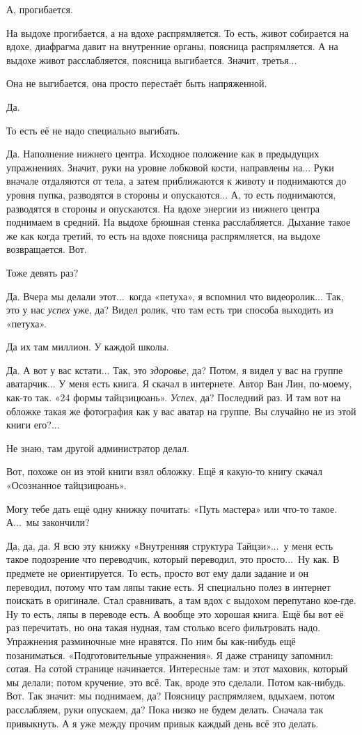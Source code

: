 \M
А, прогибается.

\I
На выдохе прогибается, а на вдохе распрямляется. То есть, живот собирается на вдохе,
диафрагма давит на внутренние органы, поясница распрямляется.
А на выдохе живот расслабляется, поясница выгибается. Значит, третья...

\M
Она не выгибается, она просто перестаёт быть напряженной.

\I
Да. 

\M
То есть её не надо
специально выгибать.

\I
Да. Наполнение нижнего центра. Исходное положение как в предыдущих упражнениях.
Значит, руки на уровне лобковой кости, направлены на... Руки вначале отдаляются от тела,
а затем приближаются к животу и поднимаются до уровня пупка, разводятся
в стороны и опускаются... А, то есть поднимаются, разводятся в стороны и опускаются.
На вдохе энергии из нижнего центра поднимаем в средний.
На выдохе брюшная стенка расслабляется. Дыхание такое
же как когда третий, то есть на вдохе поясница
распрямляется, на выдохе возвращается. Вот.

\M
Тоже девять раз?

\I
Да. Вчера мы делали этот...\ когда «петуха», я вспомнил что видеоролик...
Так, это у нас {\it успех\/} уже, да? Видел ролик, что там
есть три способа выходить из «петуха».

\M
Да их там миллион. У каждой школы.

\I
Да. А вот у вас кстати... Так, это {\it здоровье}, да?
Потом, я видел у
вас на группе аватарчик...
У меня есть книга. Я скачал в интернете. Автор Ван Лин, по-моему, как-то так.
«24 формы тайцзицюань». {\it Успех}, да? Последний раз. И там вот на обложке такая же фотография
как у вас аватар на группе. Вы случайно не из этой книги его?...

\M
Не знаю, там другой администратор делал.

\I
Вот, похоже он из этой книги взял обложку.
Ещё я какую-то
книгу скачал «Осознанное тайцзицюань».

\M
Могу тебе дать ещё одну книжку почитать: «Путь мастера» или что-то такое.
А...\ мы закончили?

\I
Да, да, да.
Я всю эту книжку «Внутренняя структура Тайцзи»...\ у меня есть такое подозрение что переводчик,
который переводил, это просто...\ Ну как. В предмете не ориентируется.
То есть, просто вот ему дали задание и он переводил, потому что там ляпы такие есть.
Я специально полез в интернет поискать в оригинале. Стал сравнивать, а там вдох с выдохом
перепутано кое-где. Ну то есть, ляпы в переводе есть. А вообще это хорошая книга.
Ещё бы вот её раз перечитать, но она такая нудная, там столько всего фильтровать надо.
Упражнения разминочные мне нравятся.
По ним бы как-нибудь ещё позаниматься.
«Подготовительные упражнения».
Я даже страницу запомнил: сотая.
На сотой странице начинается. Интересные там: и этот маховик, который мы делали; потом кручение,
это всё. Так, вроде это сделали.
Потом как-нибудь. Вот. Так значит: мы поднимаем, да? Поясницу распрямляем, вдыхаем,
потом расслабляем, руки опускаем, да?
Пока низко не будем делать. Сначала так привыкнуть.
А я уже между прочим
привык каждый день всё
это делать.

